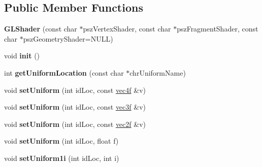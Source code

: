 \subsection*{Public Member Functions}
\begin{DoxyCompactItemize}
\item 
\hypertarget{classps_1_1opengl_1_1GLShader_aec8a882e9b10c451769bbbc05fa7db6c}{}{\bfseries G\+L\+Shader} (const char $\ast$psz\+Vertex\+Shader, const char $\ast$psz\+Fragment\+Shader, const char $\ast$psz\+Geometry\+Shader=N\+U\+L\+L)\label{classps_1_1opengl_1_1GLShader_aec8a882e9b10c451769bbbc05fa7db6c}

\item 
\hypertarget{classps_1_1opengl_1_1GLShader_ad8c7835468468206aed1003fa2102c3a}{}void {\bfseries init} ()\label{classps_1_1opengl_1_1GLShader_ad8c7835468468206aed1003fa2102c3a}

\item 
\hypertarget{classps_1_1opengl_1_1GLShader_af3b31be55cd7014586268da6187ae4ab}{}int {\bfseries get\+Uniform\+Location} (const char $\ast$chr\+Uniform\+Name)\label{classps_1_1opengl_1_1GLShader_af3b31be55cd7014586268da6187ae4ab}

\item 
\hypertarget{classps_1_1opengl_1_1GLShader_ad5551ce31a6a3cef1d34b673c8c9d43a}{}void {\bfseries set\+Uniform} (int id\+Loc, const \hyperlink{classps_1_1base_1_1Vec4}{vec4f} \&v)\label{classps_1_1opengl_1_1GLShader_ad5551ce31a6a3cef1d34b673c8c9d43a}

\item 
\hypertarget{classps_1_1opengl_1_1GLShader_abd9fbdc173cf3aaaa83d1e61fc636bac}{}void {\bfseries set\+Uniform} (int id\+Loc, const \hyperlink{classps_1_1base_1_1Vec3}{vec3f} \&v)\label{classps_1_1opengl_1_1GLShader_abd9fbdc173cf3aaaa83d1e61fc636bac}

\item 
\hypertarget{classps_1_1opengl_1_1GLShader_a43fada3ffc1f35b513d44b2cd56a9bbf}{}void {\bfseries set\+Uniform} (int id\+Loc, const \hyperlink{classps_1_1base_1_1Vec2}{vec2f} \&v)\label{classps_1_1opengl_1_1GLShader_a43fada3ffc1f35b513d44b2cd56a9bbf}

\item 
\hypertarget{classps_1_1opengl_1_1GLShader_abbf948b374f5c24b1b8cdb8abbfa5c82}{}void {\bfseries set\+Uniform} (int id\+Loc, float f)\label{classps_1_1opengl_1_1GLShader_abbf948b374f5c24b1b8cdb8abbfa5c82}

\item 
\hypertarget{classps_1_1opengl_1_1GLShader_ac835a8fc64ba683fd919ecbab15b5218}{}void {\bfseries set\+Uniform1i} (int id\+Loc, int i)\label{classps_1_1opengl_1_1GLShader_ac835a8fc64ba683fd919ecbab15b5218}


\end{DoxyCompactItemize}
